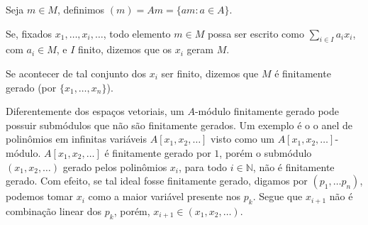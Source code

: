 \begin{definition}
	\label{loc:def_6_:_módulos_finitamente_gerados_e_livres.definição_:_finitamente_gerado}
	Seja $m \in M$, definimos $(m) = Am = \{ am : a \in A \}$.

	Se, fixados $x_{1}, \dots, x_{i}, \dots$, todo elemento $m \in M$ possa ser escrito como $\sum_{i \in I} a_{i}x_{i}$, com $a_{i}\in M$, e $I$ finito, dizemos que os $x_{i}$ geram $M$.

	Se acontecer de tal conjunto dos $x_{i}$ ser finito, dizemos que $M$ é finitamente gerado (por $\{ x_{1}, \dots, x_{n} \}$).
\end{definition}
Diferentemente dos espaços vetoriais, um $A$-módulo finitamente gerado pode possuir submódulos que não são finitamente gerados. Um exemplo é o o anel de polinômios em infinitas variáveis $A[x_{1}, x_{2}, \dots]$ visto como um $A[x_{1}, x_{2}, \dots]$-módulo. $A[x_{1}, x_{2}, \dots]$ é finitamente gerado por $1$, porém o submódulo $(x_{1},x_{2},  \dots)$ gerado pelos polinômios $x_{i}$, para todo $i \in \mathbb{N}$, não é finitamente gerado. Com efeito, se tal ideal fosse finitamente gerado, digamos por $(p_{1}, \dots p_{n})$, podemos tomar $x_{i}$ como a maior variável presente nos $p_{k}$. Segue que $x_{i+1}$ não é combinação linear dos $p_{k}$, porém, $x_{i+1}\in(x_{1},x_{2}, \dots)$.

